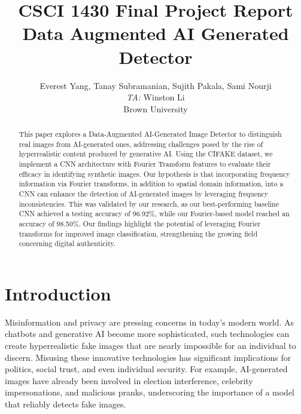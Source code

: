 \title{CSCI 1430 Final Project Report\\Data Augmented AI Generated Detector}

\author{
Everest Yang, Tanay Subramanian, Sujith Pakala, Sami Nourji\\
    \emph{TA:} Winston Li \\
    Brown University\\
}

\maketitle

\begin{abstract}
This paper explores a Data-Augmented AI-Generated Image Detector to distinguish real images from AI-generated ones, addressing challenges posed by the rise of hyperrealistic content produced by generative AI. Using the CIFAKE dataset, we implement a CNN architecture with Fourier Transform features to evaluate their efficacy in identifying synthetic images. Our hypothesis is that incorporating frequency information via Fourier transforms, in addition to spatial domain information, into a CNN can enhance the detection of AI-generated images by leveraging frequency inconsistencies. This was validated by our research, as our best-performing baseline CNN achieved a testing accuracy of 96.92\%, while our Fourier-based model reached an accuracy of 98.50\%. Our findings highlight the potential of leveraging Fourier transforms for improved image classification, strengthening the growing field concerning digital authenticity.
\end{abstract}

\section{Introduction}

Misinformation and privacy are pressing concerns in today’s modern world. As chatbots and generative AI become more sophisticated, such technologies can create hyperrealistic fake images that are nearly impossible for an individual to discern. Misusing these innovative technologies has significant implications for politics, social trust, and even individual security. For example, AI-generated images have already been involved in election interference, celebrity impersonations, and malicious pranks, underscoring the importance of a model that reliably detects fake images.

